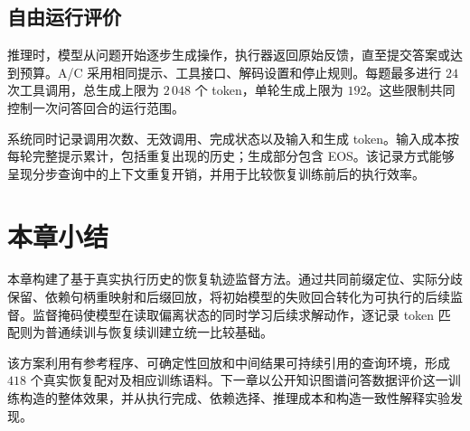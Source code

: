 \subsection{自由运行评价}

推理时，模型从问题开始逐步生成操作，执行器返回原始反馈，直至提交答案或达到预算。A/C 采用相同提示、工具接口、解码设置和停止规则。每题最多进行 $24$ 次工具调用，总生成上限为 $2\,048$ 个 token，单轮生成上限为 $192$。这些限制共同控制一次问答回合的运行范围。

系统同时记录调用次数、无效调用、完成状态以及输入和生成 token。输入成本按每轮完整提示累计，包括重复出现的历史；生成部分包含 EOS。该记录方式能够呈现分步查询中的上下文重复开销，并用于比较恢复训练前后的执行效率。

\section{本章小结}

本章构建了基于真实执行历史的恢复轨迹监督方法。通过共同前缀定位、实际分歧保留、依赖句柄重映射和后缀回放，将初始模型的失败回合转化为可执行的后续监督。监督掩码使模型在读取偏离状态的同时学习后续求解动作，逐记录 token 匹配则为普通续训与恢复续训建立统一比较基础。

该方案利用有参考程序、可确定性回放和中间结果可持续引用的查询环境，形成 $418$ 个真实恢复配对及相应训练语料。下一章以公开知识图谱问答数据评价这一训练构造的整体效果，并从执行完成、依赖选择、推理成本和构造一致性解释实验发现。
